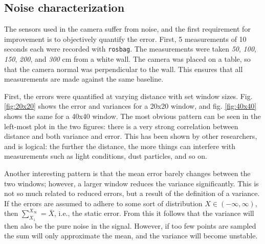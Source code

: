 \documentclass[11pt]{article}
\begin{document}
\subsection{Noise characterization}
The sensors used in the camera suffer from noise, and the first requirement for improvement is to objectively quantify the error. First, 5 measurements of 10 seconds each were recorded with \texttt{rosbag}. The measurements were taken \emph{50}, \emph{100}, \emph{150}, \emph{200}, and \emph{300} cm from a white wall. The camera was placed on a table, so that the  camera normal was perpendicular to the wall. This ensures that all measurements are made against the same baseline. \par

First, the errors were quantified at varying distance with set window sizes. Fig. \vref{fig:20x20} shows the error and variances for a 20x20 window, and fig. \vref{fig:40x40} shows the same for a 40x40 window. The most obvious pattern can be seen in the left-most plot in the two figures: there is a very strong correlation between distance and both variance and error. This has been shown by other researchers, and is logical: the further the distance, the more things can interfere with measurements such as light conditions, dust particles, and so on. \par

Another interesting pattern is that the mean error barely changes between the two windows; however, a larger window reduces the variance significantly. This is not so much related to reduced errors, but a result of the definition of a variance. If the errors are assumed to adhere to some sort of distribution $X \in \left(-\infty, \infty \right)$, then $\sum_{X_1}^{X_\infty} = \bar{X}$, i.e., the static error. From this it follows that the variance will then also be the pure noise in the signal. However, if too few points are sampled the sum will only approximate the mean, and the variance will become unstable.
\end{document}
